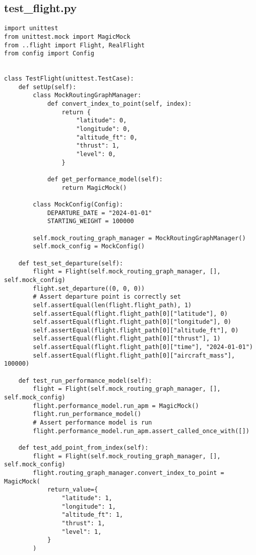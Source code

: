 \subsection{test_flight.py}
\begin{verbatim}
import unittest
from unittest.mock import MagicMock
from ..flight import Flight, RealFlight
from config import Config


class TestFlight(unittest.TestCase):
    def setUp(self):
        class MockRoutingGraphManager:
            def convert_index_to_point(self, index):
                return {
                    "latitude": 0,
                    "longitude": 0,
                    "altitude_ft": 0,
                    "thrust": 1,
                    "level": 0,
                }

            def get_performance_model(self):
                return MagicMock()

        class MockConfig(Config):
            DEPARTURE_DATE = "2024-01-01"
            STARTING_WEIGHT = 100000

        self.mock_routing_graph_manager = MockRoutingGraphManager()
        self.mock_config = MockConfig()

    def test_set_departure(self):
        flight = Flight(self.mock_routing_graph_manager, [], self.mock_config)
        flight.set_departure((0, 0, 0))
        # Assert departure point is correctly set
        self.assertEqual(len(flight.flight_path), 1)
        self.assertEqual(flight.flight_path[0]["latitude"], 0)
        self.assertEqual(flight.flight_path[0]["longitude"], 0)
        self.assertEqual(flight.flight_path[0]["altitude_ft"], 0)
        self.assertEqual(flight.flight_path[0]["thrust"], 1)
        self.assertEqual(flight.flight_path[0]["time"], "2024-01-01")
        self.assertEqual(flight.flight_path[0]["aircraft_mass"], 100000)

    def test_run_performance_model(self):
        flight = Flight(self.mock_routing_graph_manager, [], self.mock_config)
        flight.performance_model.run_apm = MagicMock()
        flight.run_performance_model()
        # Assert performance model is run
        flight.performance_model.run_apm.assert_called_once_with([])

    def test_add_point_from_index(self):
        flight = Flight(self.mock_routing_graph_manager, [], self.mock_config)
        flight.routing_graph_manager.convert_index_to_point = MagicMock(
            return_value={
                "latitude": 1,
                "longitude": 1,
                "altitude_ft": 1,
                "thrust": 1,
                "level": 1,
            }
        )


\end{verbatim}
